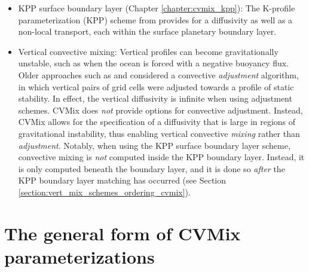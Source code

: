 \begin{itemize}
\item {\sc KPP surface boundary layer} (Chapter
  \ref{chapter:cvmix_kpp}): The K-profile parameterization (KPP)
  scheme from \cite{LargeKPP} provides for a diffusivity as well as a
  non-local transport, each within the surface planetary boundary
  layer.

\item {\sc Vertical convective mixing}: Vertical profiles can become
  gravitationally unstable, such as when the ocean is forced with a
  negative buoyancy flux.  Older approaches such as \cite{CoxModel}
  and \cite{Rahmstorf1993} considered a convective {\it adjustment}
  algorithm, in which vertical pairs of grid cells were adjusted
  towards a profile of static stability.  In effect, the vertical
  diffusivity is infinite when using adjustment schemes.  CVMix does
  {\it not} provide options for convective adjustment.  Instead, CVMix
  allows for the specification of a diffusivity that is large in
  regions of gravitational instability, thus enabling vertical
  convective {\it mixing} rather than {\it adjustment}.  Notably, when
  using the KPP surface boundary layer scheme, convective mixing is
  {\it not} computed inside the KPP boundary layer.  Instead, it is
  only computed beneath the boundary layer, and it is done so {\it
    after} the KPP boundary layer matching has occurred (see Section
  \ref{section:vert_mix_schemes_ordering_cvmix}).


\end{itemize}


\section{The general form of CVMix parameterizations}
\label{section:vert_mix_schemes_general_cvmix}

